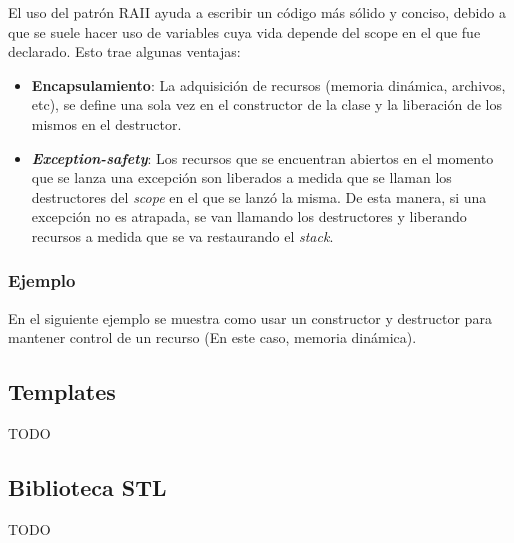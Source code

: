\documentclass[oneside]{article}
\begin{document}
	El uso del patrón RAII ayuda a escribir un código más sólido y conciso, debido a que se suele hacer uso de variables cuya vida depende del scope en el que fue declarado. Esto trae algunas ventajas:
	\begin{itemize}
		\item \textbf{Encapsulamiento}: La adquisición de recursos (memoria dinámica, archivos, etc), se define una sola vez en el constructor de la clase y la liberación de los mismos en el destructor.
		\item \emph{\textbf{Exception-safety}}: Los recursos que se encuentran abiertos en el momento que se lanza una excepción son liberados a medida que se llaman los destructores del \emph{scope} en el que se lanzó la misma. De esta manera, si una excepción no es atrapada, se van llamando los destructores y liberando recursos a medida que se va restaurando el \emph{stack}.
	\end{itemize}

\pagebreak

	\subsubsection{Ejemplo}
		En el siguiente ejemplo se muestra como usar un constructor y destructor para mantener control de un recurso (En este caso, memoria dinámica).
		

	\subsection{Templates}
	TODO %

	\subsection{Biblioteca STL}
	TODO %
\end{document}
